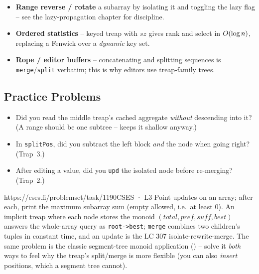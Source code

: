 \begin{hardeningbox}
\begin{itemize}[nosep, leftmargin=1.4em]
  \item \textbf{Range reverse / rotate} a subarray by isolating it and toggling the lazy flag -- see the
        lazy-propagation chapter  for discipline.
  \item \textbf{Ordered statistics} -- keyed treap with $\mathit{sz}$ gives rank and select in $O(\log n)$,
        replacing a Fenwick over a \emph{dynamic} key set.
  \item \textbf{Rope / editor buffers} -- concatenating and splitting sequences is \texttt{merge}/\texttt{split}
        verbatim; this is why editors use treap-family trees.
\end{itemize}
\end{hardeningbox}

\subsection{Practice Problems}

\begin{stuckbox}
\begin{itemize}[nosep, leftmargin=1.4em]
  \item Did you read the middle treap's cached aggregate \emph{without} descending into it? (A range should be
        one subtree --  keeps it shallow anyway.)
  \item In \texttt{splitPos}, did you subtract the left block \emph{and} the node when going right? (Trap~3.)
  \item After editing a value, did you \texttt{upd} the isolated node before re-merging? (Trap~2.)
\end{itemize}
\end{stuckbox}

\begin{practiceset}
    {https://cses.fi/problemset/task/1190}{CSES · L3}
    {Point updates on an array; after each, print the maximum subarray sum (empty allowed, i.e.\ at least
    $0$). An implicit treap where each node stores the monoid $(\mathit{total},\mathit{pref},\mathit{suff},
    \mathit{best})$ answers the whole-array query as \texttt{root->best}; \texttt{merge} combines two
    children's tuples in constant time, and an update is the LC 307 isolate-rewrite-merge. The same problem is
    the classic segment-tree monoid application () -- solve it \emph{both} ways to feel why the
    treap's split/merge is more flexible (you can also \emph{insert} positions, which a segment tree cannot).}
\end{practiceset}


